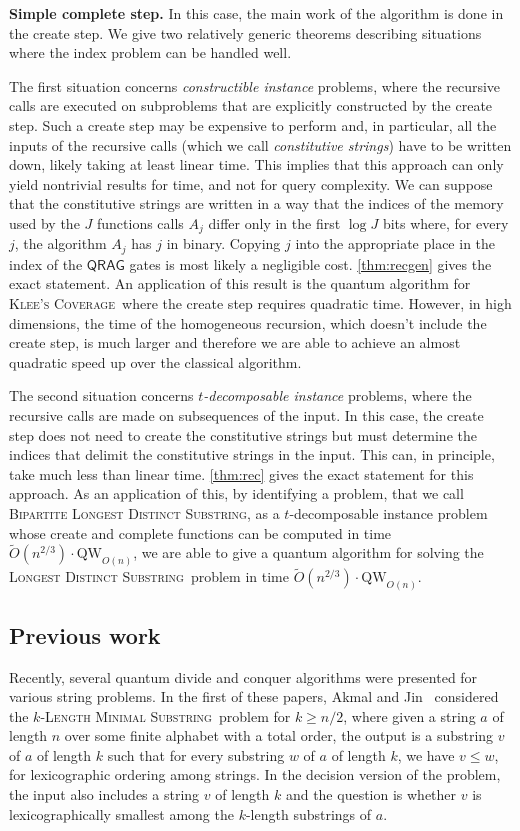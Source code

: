 \documentclass[12pt]{article}
\newcommand{\qw}{\mathrm{QW}}
\newcommand{\bldsf}{\textsc{Bipartite Longest Distinct Substring}}
\newcommand{\ldsf}{\textsc{Longest Distinct Substring}}
\newcommand{\LMSf}{\textsc{Length Minimal Substring}}
\newcommand{\KCf}{\textsc{Klee's Coverage}}
\theoremstyle{definition}
\begin{document}
{\bf Simple complete step.}  
In this case, the main work of the algorithm is done in the create step. We give two relatively generic theorems describing situations where the index problem can be handled well.

The first situation concerns \emph{constructible instance} problems, where the recursive calls are executed on subproblems that are explicitly constructed by the create step. Such a create step may be expensive to perform and, in particular, all the inputs of the recursive calls (which we call {\em constitutive strings}) have to be written down, likely taking at least linear time. This implies that this approach can only yield nontrivial results for time, and not for query complexity.
We can suppose that the constitutive strings are written in a way that the indices of the memory used by the $J$ functions calls $A_j$ differ only in the first $\log J$ bits where, for every $j$, the algorithm $A_j$ has $j$ in binary. Copying $j$ into the appropriate place in the index of the $\mathsf{QRAG}$ gates is most likely a negligible cost. \cref{thm:recgen} gives the exact statement. An application of this result is the quantum algorithm for \KCf \, where the create step requires quadratic time.
However, in high dimensions, the time of the homogeneous recursion, which doesn't include the create step, is much larger and therefore we are able to achieve
an almost quadratic speed up over the classical algorithm.

The second situation concerns {\em $t$-decomposable instance} problems, where the recursive calls are made on subsequences of the input. In this case, the create step does not need to create the constitutive strings but must determine the indices that delimit the constitutive strings in the input. This can, in principle, take much less than linear time. 
\cref{thm:rec} gives the exact statement for this approach. As an application of this, by identifying a problem, that we call \bldsf, as a $t$-decomposable instance problem whose create and complete functions can be computed in time $\widetilde{O}(n^{2/3}) \cdot \qw_{O(n)}$, we are able to give a quantum algorithm for solving the \ldsf\ problem in time  $\widetilde{O}(n^{2/3}) \cdot \qw_{O(n)}$.  

\subsection{Previous work}
Recently, several quantum divide and conquer algorithms were presented for various string problems.
In the first of these papers, Akmal and Jin~\cite{AJ22} considered the $k$-\LMSf \ problem for $k \geq n/2$, where given a string $a$ of length $n$ over some finite
alphabet with a total order, the output is a substring $v$ of $a$ of length $k$ such that for every substring $w$ of $a$ of length $k$, we have $v \leq w$, for lexicographic ordering among strings. In the decision version of the problem, the input also includes a string $v$ of length $k$ and the question is whether $v$ is lexicographically smallest among the $k$-length substrings of $a$. 
\end{document}
